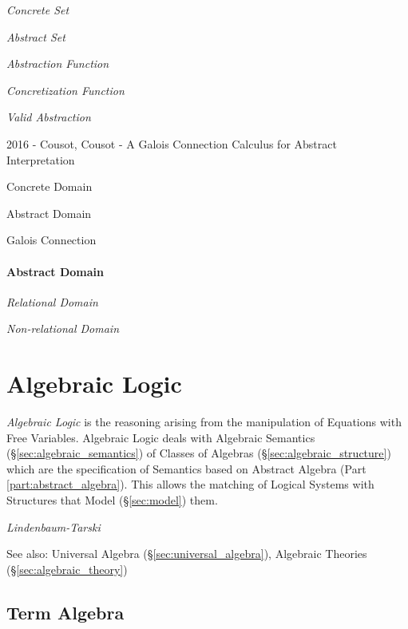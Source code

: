 \emph{Concrete Set}

\emph{Abstract Set}

\emph{Abstraction Function}

\emph{Concretization Function}

\emph{Valid Abstraction}

2016 - Cousot, Cousot - A Galois Connection Calculus for Abstract
Interpretation %

Concrete Domain

Abstract Domain

Galois Connection



\paragraph{Abstract Domain}\label{sec:abstract_domain}\hfill

\emph{Relational Domain}

\emph{Non-relational Domain}



\section{Algebraic Logic}\label{sec:algebraic_logic}

\emph{Algebraic Logic} is the reasoning arising from the manipulation of
Equations with Free Variables. Algebraic Logic deals with Algebraic Semantics
(\S\ref{sec:algebraic_semantics}) of Classes of Algebras
(\S\ref{sec:algebraic_structure}) which are the specification of Semantics
based on Abstract Algebra (Part \ref{part:abstract_algebra}). This allows the
matching of Logical Systems with Structures that Model (\S\ref{sec:model})
them.

\emph{Lindenbaum-Tarski}

\fist See also: Universal Algebra (\S\ref{sec:universal_algebra}), Algebraic
Theories (\S\ref{sec:algebraic_theory})



\subsection{Term Algebra}\label{sec:term_algebra}

